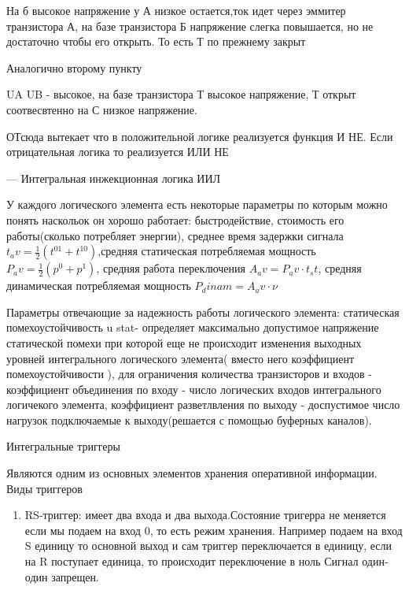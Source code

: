 \documentclass[../main.tex]{subfiles}
\begin{document}
На б высокое напряжение у А низкое остается,ток идет через эммитер транзистора А, на базе транзистора Б напряжение слегка повышается, но не достаточно чтобы его открыть.
То есть Т по прежнему закрыт

Аналогично второму пункту

UA UB - высокое, на базе транзистора Т высокое напряжение, Т открыт соотвесвтенно на С низкое напряжение. 

ОТсюда вытекает что в положительной логике реализуется функция И НЕ. Если отрицательная логика то реализуется ИЛИ НЕ

--- Интегральная инжекционная логика ИИЛ

У каждого логического элемента есть некоторые параметры по которым можно понять наскольок он хорошо работает: быстродействие, стоимость его работы(сколько потребляет энергии),
среднее время задержки сигнала $t_av = \frac{1}{2}(t^{01} + t^{10})$,средняя статическая потребляемая мощность $P_av = \frac{1}{2}(p^0 + p^1)$,
средняя работа переключения $A_av = P_av \cdot t_st$, средняя динамическая потребляемая мощность $P_dinam = A_av \cdot \nu$ 

Параметры отвечающие за надежность работы логического элемента: статическая помехоустойчивость u stat- определяет максимально допустимое напряжение статической помехи при которой 
еще не происходит изменения выходных уровней интегрального логического элемента( вместо него коэффициент помехоустойчивости ),
для ограничения количества транзисторов и входов - коэффициент объединения по входу - число логических входов интегрального логичекого элемента, коэффициент 
разветлвления по выходу - доспустимое число нагрузок подключаемые к выходу(решается с помощью буферных каналов). 

Интегральные триггеры

Являются одним из основных элементов хранения оперативной информации.
Виды триггеров
\begin{enumerate}
    \item RS-триггер: имеет два входа и два выхода.Состояние тригерра не меняется если мы подаем на вход 0, то есть режим хранения.
    Например подаем на вход S единицу то основной выход и сам триггер переключается в единицу, если на R поступает единица, то происходит переключение в ноль
    Сигнал один-один запрещен.
\end{enumerate}
\end{document}
